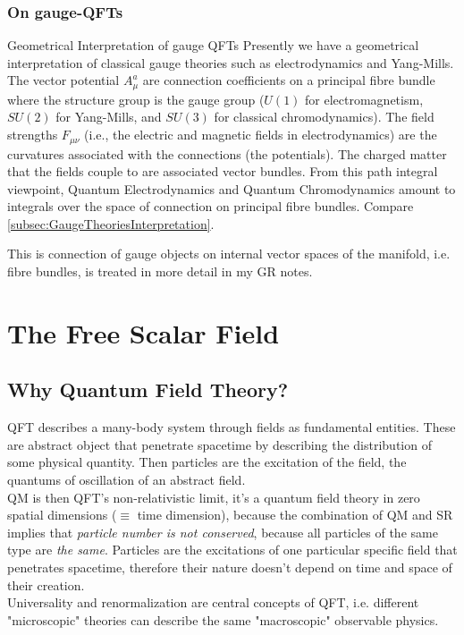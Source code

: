 \subsubsection{On gauge-QFTs}
\begin{mybox}{Geometrical Interpretation of gauge QFTs}
	Presently we have a geometrical interpretation of classical gauge theories such as electrodynamics and Yang-Mills. The vector potential $A^a_{\mu}$ are connection coefficients on a principal fibre bundle where the structure group is the gauge group ($U(1)$ for electromagnetism, $SU(2)$ for Yang-Mills, and $SU(3)$ for classical chromodynamics). The field strengths $F_{\mu \nu}$ (i.e., the electric and magnetic fields in electrodynamics) are the curvatures associated with the connections (the potentials). The charged matter that the fields couple to are associated vector bundles. From this path integral viewpoint, Quantum Electrodynamics and Quantum Chromodynamics amount to integrals over the space of connection on principal fibre bundles. 
	Compare \ref{subsec:GaugeTheoriesInterpretation}.
\end{mybox}
This is connection of gauge objects on internal vector spaces of the manifold, i.e. fibre bundles, is treated in more detail in my GR notes.

































\section{The Free Scalar Field}
\subsection{Why Quantum Field Theory?}
QFT describes a many-body system through fields as fundamental entities. These are abstract object that penetrate spacetime by describing the distribution of some physical quantity. Then particles are the excitation of the field, the quantums of oscillation of an abstract field.\\
QM is then QFT's non-relativistic limit, it's a quantum field theory in zero spatial dimensions ($\equiv$ time dimension),
because the combination of QM and SR implies that \emph{particle number is not conserved}, because all particles of the same type are \emph{the same}. Particles are the excitations of one particular specific field that penetrates spacetime, therefore their nature doesn't depend on time and space of their creation.\\
Universality and renormalization are central concepts of QFT, i.e. different "microscopic" theories can describe the same "macroscopic" observable physics.
